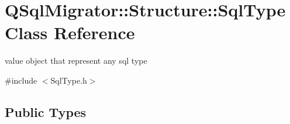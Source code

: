 \hypertarget{class_q_sql_migrator_1_1_structure_1_1_sql_type}{}\section{Q\+Sql\+Migrator\+:\+:Structure\+:\+:Sql\+Type Class Reference}
\label{class_q_sql_migrator_1_1_structure_1_1_sql_type}


value object that represent any sql type  




{\ttfamily \#include $<$Sql\+Type.\+h$>$}

\subsection*{Public Types}
